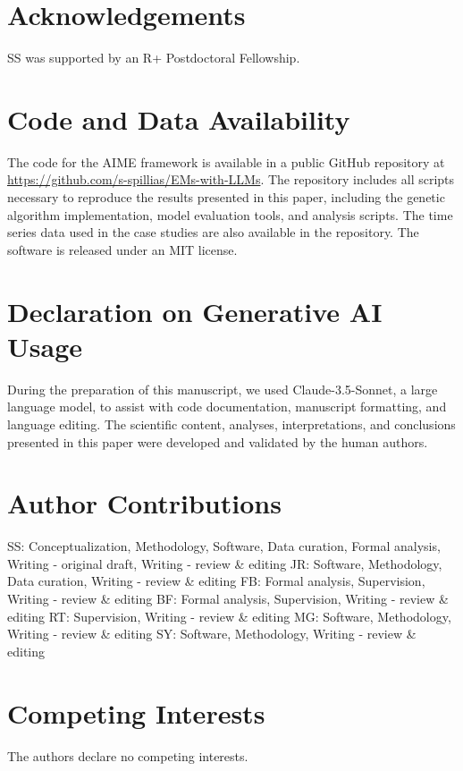 
\section*{Acknowledgements}
SS was supported by an R+ Postdoctoral Fellowship. 

\section*{Code and Data Availability}
The code for the AIME framework is available in a public GitHub repository at \url{https://github.com/s-spillias/EMs-with-LLMs}. The repository includes all scripts necessary to reproduce the results presented in this paper, including the genetic algorithm implementation, model evaluation tools, and analysis scripts. The time series data used in the case studies are also available in the repository. The software is released under an MIT license.

\section*{Declaration on Generative AI Usage}
During the preparation of this manuscript, we used Claude-3.5-Sonnet, a large language model, to assist with code documentation, manuscript formatting, and language editing. The scientific content, analyses, interpretations, and conclusions presented in this paper were developed and validated by the human authors. 

\section*{Author Contributions}
SS: Conceptualization, Methodology, Software, Data curation, Formal analysis, Writing - original draft, Writing - review \& editing
JR: Software, Methodology, Data curation, Writing - review \& editing
FB: Formal analysis, Supervision, Writing - review \& editing
BF: Formal analysis, Supervision, Writing - review \& editing
RT: Supervision, Writing - review \& editing
MG: Software, Methodology, Writing - review \& editing
SY: Software, Methodology, Writing - review \& editing

\section*{Competing Interests}
The authors declare no competing interests.

